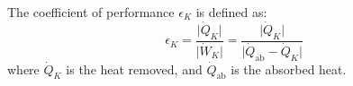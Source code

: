 The coefficient of performance \( \epsilon_K \) is defined as:  
\[
\epsilon_K = \frac{\lvert \dot{Q}_K \rvert}{\lvert \dot{W}_K \rvert} = \frac{\lvert \dot{Q}_K \rvert}{\lvert \dot{Q}_{\text{ab}} - \dot{Q}_K \rvert}
\]  
where \( \dot{Q}_K \) is the heat removed, and \( \dot{Q}_{\text{ab}} \) is the absorbed heat.